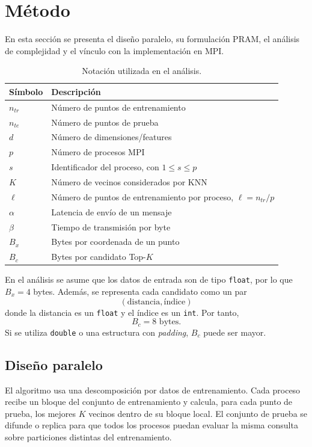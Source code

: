 \documentclass[11pt,a4paper]{article}
\begin{document}
\section{Método}

En esta sección se presenta el diseño paralelo, su formulación PRAM, el análisis de complejidad
y el vínculo con la implementación en MPI.

\begin{table}[H]
\centering
\begin{tabular}{ll}
\toprule
Símbolo & Descripción \\
\midrule
$n_{tr}$ & Número de puntos de entrenamiento \\
$n_{te}$ & Número de puntos de prueba \\
$d$ & Número de dimensiones/features \\
$p$ & Número de procesos MPI \\
$s$ & Identificador del proceso, con $1 \leq s \leq p$ \\
$K$ & Número de vecinos considerados por KNN \\
$\ell$ & Número de puntos de entrenamiento por proceso, $\ell = n_{tr}/p$ \\
$\alpha$ & Latencia de envío de un mensaje \\
$\beta$ & Tiempo de transmisión por byte \\
$B_x$ & Bytes por coordenada de un punto \\
$B_c$ & Bytes por candidato Top-$K$ \\
\bottomrule
\end{tabular}
\caption{Notación utilizada en el análisis.}
\end{table}

En el análisis se asume que los datos de entrada son de tipo \texttt{float}, por lo que
$B_x = 4$ bytes. Además, se representa cada candidato como un par
\[
(\text{distancia}, \text{índice})
\]
donde la distancia es un \texttt{float} y el índice es un \texttt{int}. Por tanto,
\[
B_c = 8 \text{ bytes}.
\]
Si se utiliza \texttt{double} o una estructura con \textit{padding}, $B_c$ puede ser mayor.

\subsection{Diseño paralelo}

El algoritmo usa una descomposición por datos de entrenamiento. Cada proceso recibe un bloque
del conjunto de entrenamiento y calcula, para cada punto de prueba, los mejores $K$ vecinos dentro
de su bloque local. El conjunto de prueba se difunde o replica para que todos los procesos puedan
evaluar la misma consulta sobre particiones distintas del entrenamiento.
\end{document}
